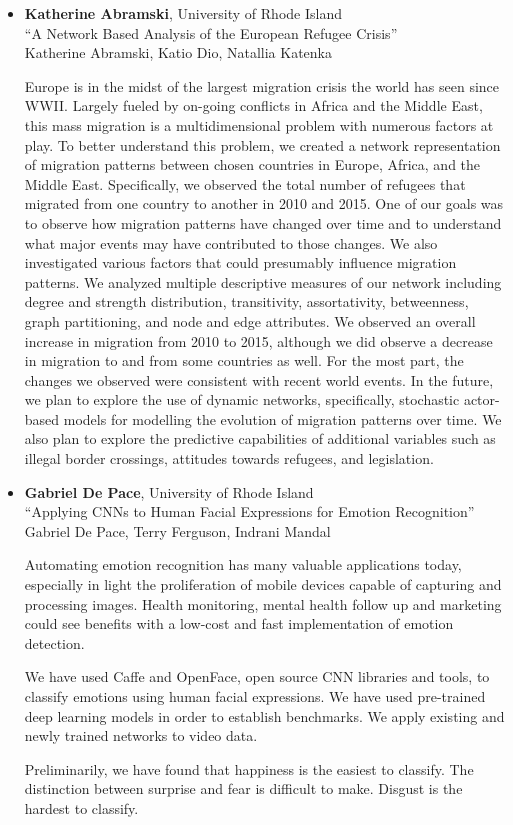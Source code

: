 \begin{itemize}
\item \textbf{Katherine Abramski}, University of Rhode Island \\
``A Network Based Analysis of the European Refugee Crisis'' \\
Katherine Abramski, Katio Dio, Natallia Katenka


Europe is in the midst of the largest migration crisis the world has seen since WWII. Largely fueled by on-going conflicts in Africa and the Middle East, this mass migration is a multidimensional problem with numerous factors at play. To better understand this problem, we created a network representation of migration patterns between chosen countries in Europe, Africa, and the Middle East. Specifically, we observed the total number of refugees that migrated from one country to another in 2010 and 2015. One of our goals was to observe how migration patterns have changed over time and to understand what major events may have contributed to those changes. We also investigated various factors that could presumably influence migration patterns. We analyzed multiple descriptive measures of our network including degree and strength distribution, transitivity, assortativity, betweenness, graph partitioning, and node and edge attributes. We observed an overall increase in migration from 2010 to 2015, although we did observe a decrease in migration to and from some countries as well. For the most part, the changes we observed were consistent with recent world events. In the future, we plan to explore the use of dynamic networks, specifically, stochastic actor-based models for modelling the evolution of migration patterns over time. We also plan to explore the predictive capabilities of additional variables such as illegal border crossings, attitudes towards refugees, and legislation.

\item \textbf{Gabriel De Pace}, University of Rhode Island \\
``Applying CNNs to Human Facial Expressions for Emotion Recognition'' \\
Gabriel De Pace, Terry Ferguson, Indrani Mandal


Automating emotion recognition has many valuable applications today, especially in light the proliferation of mobile devices capable of capturing and processing images. Health monitoring, mental health follow up and marketing could see benefits with a low-cost and fast implementation of emotion detection.

We have used Caffe and OpenFace, open source CNN libraries and tools, to classify emotions using human facial expressions. We have used pre-trained deep learning models in order to establish benchmarks.  We apply existing and newly trained networks to video data.

Preliminarily, we have found that happiness is the easiest to classify.  The distinction between surprise and fear is difficult to make.  Disgust is the hardest to classify.

\end{itemize}

